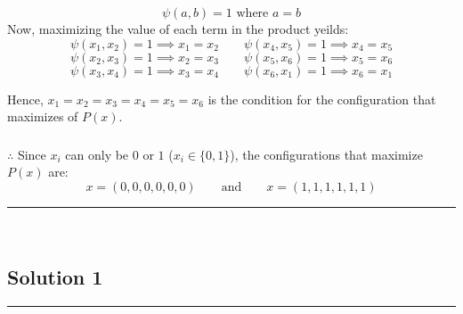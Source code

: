 \documentclass{article}
\begin{document}
$$\psi(a, b) = 1 \text{ where } a=b$$
Now, maximizing the value of each term in the product yeilds:
$$\psi(x_1, x_2) = 1 \implies  x_1 = x_2 \qquad \psi(x_4, x_5) = 1 \implies  x_4 = x_5$$
$$\psi(x_2, x_3) = 1 \implies  x_2 = x_3 \qquad \psi(x_5, x_6) = 1 \implies  x_5 = x_6$$
$$\psi(x_3, x_4) = 1 \implies  x_3 = x_4 \qquad \psi(x_6, x_1) = 1 \implies  x_6 = x_1$$

\begin{flushleft}
    Hence, $x_1 = x_2 = x_3 = x_4 = x_5 = x_6$ is the condition for the configuration that maximizes of $P(x)$. 
\end{flushleft}

\subsubsection*{\normalfont}{$\therefore$ Since $x_i$ can only be $0$ or $1$ ($x_i \in \{0,1\}$), the configurations that maximize $P(x)$ are:}
$$x = (0, 0, 0, 0, 0, 0) \qquad \text{and} \qquad x = (1, 1, 1, 1, 1, 1)$$

\noindent\rule{\textwidth}{0.4pt}\\

\newpage

\subsection*{Solution 1}
\noindent\rule{\textwidth}{0.4pt}\\
\end{document}
